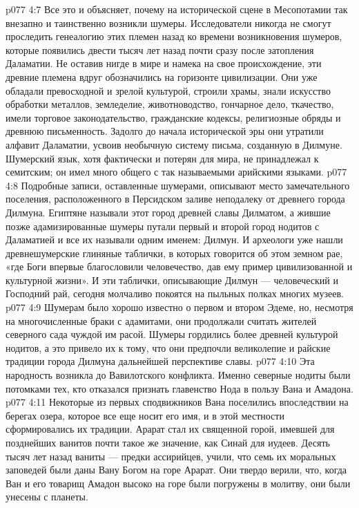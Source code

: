 \vs p077 4:7 Все это и объясняет, почему на исторической сцене в Месопотамии так внезапно и таинственно возникли шумеры. Исследователи никогда не смогут проследить генеалогию этих племен назад ко времени возникновения шумеров, которые появились двести тысяч лет назад почти сразу после затопления Даламатии. Не оставив нигде в мире и намека на свое происхождение, эти древние племена вдруг обозначились на горизонте цивилизации. Они уже обладали превосходной и зрелой культурой, строили храмы, знали искусство обработки металлов, земледелие, животноводство, гончарное дело, ткачество, имели торговое законодательство, гражданские кодексы, религиозные обряды и древнюю письменность. Задолго до начала исторической эры они утратили алфавит Даламатии, усвоив необычную систему письма, созданную в Дилмуне. Шумерский язык, хотя фактически и потерян для мира, не принадлежал к семитским; он имел много общего с так называемыми арийскими языками.
\vs p077 4:8 Подробные записи, оставленные шумерами, описывают место замечательного поселения, расположенного в Персидском заливе неподалеку от древнего города Дилмуна. Египтяне называли этот город древней славы Дилматом, а жившие позже адамизированные шумеры путали первый и второй город нодитов с Даламатией и все их называли одним именем: Дилмун. И археологи уже нашли древнешумерские глиняные таблички, в которых говорится об этом земном рае, «где Боги впервые благословили человечество, дав ему пример цивилизованной и культурной жизни». И эти таблички, описывающие Дилмун --- человеческий и Господний рай, сегодня молчаливо покоятся на пыльных полках многих музеев.
\vs p077 4:9 Шумерам было хорошо известно о первом и втором Эдеме, но, несмотря на многочисленные браки с адамитами, они продолжали считать жителей северного сада чуждой им расой. Шумеры гордились более древней культурой нодитов, а это привело их к тому, что они предпочли великолепие и райские традиции города Дилмуна дальнейшей перспективе славы.
\vs p077 4:10 \bibnobreakspace {} Эта народность возникла до Вавилотского конфликта. Именно северные нодиты были потомками тех, кто отказался признать главенство Нода в пользу Вана и Амадона.
\vs p077 4:11 \pc Некоторые из первых сподвижников Вана поселились впоследствии на берегах озера, которое все еще носит его имя, и в этой местности сформировались их традиции. Арарат стал их священной горой, имевшей для позднейших ванитов почти такое же значение, как Синай для иудеев. Десять тысяч лет назад ваниты --- предки ассирийцев, учили, что семь их моральных заповедей были даны Вану Богом на горе Арарат. Они твердо верили, что, когда Ван и его товарищ Амадон высоко на горе были погружены в молитву, они были унесены с планеты.

